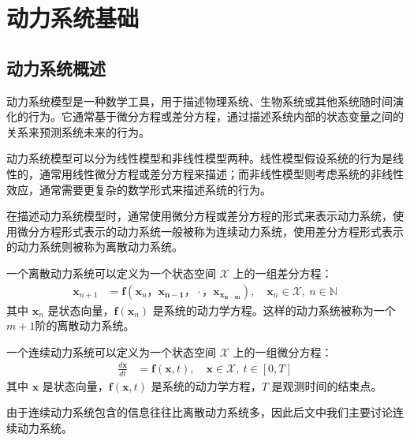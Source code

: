 \chapter{动力系统基础}\label{chap:dynamic}


\section{动力系统概述}
动力系统模型是一种数学工具，用于描述物理系统、生物系统或其他系统随时间演化的行为。它通常基于微分方程或差分方程，通过描述系统内部的状态变量之间的关系来预测系统未来的行为。

动力系统模型可以分为线性模型和非线性模型两种。线性模型假设系统的行为是线性的，通常用线性微分方程或差分方程来描述；而非线性模型则考虑系统的非线性效应，通常需要更复杂的数学形式来描述系统的行为。

在描述动力系统模型时，通常使用微分方程或差分方程的形式来表示动力系统，使用微分方程形式表示的动力系统一般被称为连续动力系统，使用差分方程形式表示的动力系统则被称为离散动力系统。
\begin{defn}[离散动力系统]
    一个离散动力系统可以定义为一个状态空间 $\mathcal{X}$ 上的一组差分方程：
    \begin{equation}\label{eq:discrete_dynamic_system}
        \begin{aligned}
            \mathbf{x}_{n+1} & = \mathbf{f}(\mathbf{x}_n，\mathbf{x_{n-1}}，\cdot，\mathbf{x_{x_{n-m}}}), \quad \mathbf{x}_n \in \mathcal{X}, \ n \in \mathbb{N}
        \end{aligned}
    \end{equation}
    其中 $\mathbf{x}_n$ 是状态向量，$\mathbf{f}(\mathbf{x}_n)$ 是系统的动力学方程。这样的动力系统被称为一个$m+1$阶的离散动力系统。
\end{defn}

\begin{defn}[连续动力系统]
    一个连续动力系统可以定义为一个状态空间 $\mathcal{X}$ 上的一组微分方程：
    \begin{equation}\label{eq:dynamic_system}
        \begin{aligned}
            \frac{d\mathbf{x}}{dt} & = \mathbf{f}(\mathbf{x}, t), \quad \mathbf{x} \in \mathcal{X}, \ t \in [0, T]
        \end{aligned}
    \end{equation}
    其中 $\mathbf{x}$ 是状态向量，$\mathbf{f}(\mathbf{x}, t)$ 是系统的动力学方程，$T$ 是观测时间的结束点。
\end{defn}

由于连续动力系统包含的信息往往比离散动力系统多，因此后文中我们主要讨论连续动力系统。

